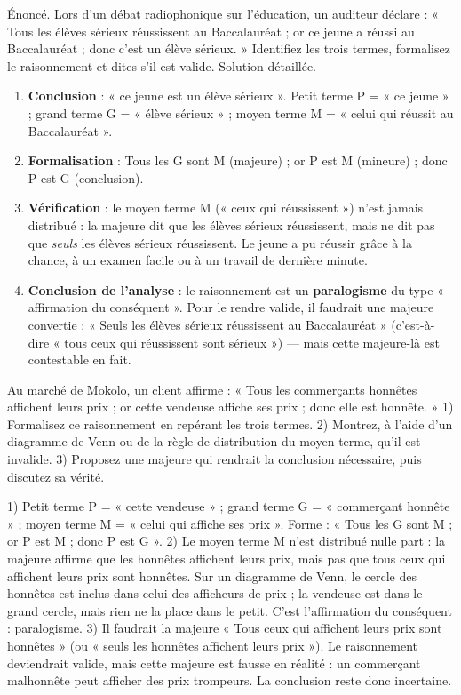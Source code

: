 \documentclass[11pt]{article}
\begin{document}
\begin{exoresolu}
Énoncé. Lors d'un débat radiophonique sur l'éducation, un auditeur déclare : « Tous les élèves sérieux réussissent au Baccalauréat ; or ce jeune a réussi au Baccalauréat ; donc c'est un élève sérieux. » Identifiez les trois termes, formalisez le raisonnement et dites s'il est valide.
\tcblower
Solution détaillée.
\begin{enumerate}
\item \textbf{Conclusion} : « ce jeune est un élève sérieux ». Petit terme P = « ce jeune » ; grand terme G = « élève sérieux » ; moyen terme M = « celui qui réussit au Baccalauréat ».
\item \textbf{Formalisation} : Tous les G sont M (majeure) ; or P est M (mineure) ; donc P est G (conclusion).
\item \textbf{Vérification} : le moyen terme M (« ceux qui réussissent ») n'est jamais distribué : la majeure dit que les élèves sérieux réussissent, mais ne dit pas que \emph{seuls} les élèves sérieux réussissent. Le jeune a pu réussir grâce à la chance, à un examen facile ou à un travail de dernière minute.
\item \textbf{Conclusion de l'analyse} : le raisonnement est un \textbf{paralogisme} du type « affirmation du conséquent ». Pour le rendre valide, il faudrait une majeure convertie : « Seuls les élèves sérieux réussissent au Baccalauréat » (c'est-à-dire « tous ceux qui réussissent sont sérieux ») — mais cette majeure-là est contestable en fait.
\end{enumerate}
\end{exoresolu}

\begin{exercice}
Au marché de Mokolo, un client affirme : « Tous les commerçants honnêtes affichent leurs prix ; or cette vendeuse affiche ses prix ; donc elle est honnête. » 1) Formalisez ce raisonnement en repérant les trois termes. 2) Montrez, à l'aide d'un diagramme de Venn ou de la règle de distribution du moyen terme, qu'il est invalide. 3) Proposez une majeure qui rendrait la conclusion nécessaire, puis discutez sa vérité.
\end{exercice}

\begin{corrige}[Exercice]
1) Petit terme P = « cette vendeuse » ; grand terme G = « commerçant honnête » ; moyen terme M = « celui qui affiche ses prix ». Forme : « Tous les G sont M ; or P est M ; donc P est G ».
2) Le moyen terme M n'est distribué nulle part : la majeure affirme que les honnêtes affichent leurs prix, mais pas que tous ceux qui affichent leurs prix sont honnêtes. Sur un diagramme de Venn, le cercle des honnêtes est inclus dans celui des afficheurs de prix ; la vendeuse est dans le grand cercle, mais rien ne la place dans le petit. C'est l'affirmation du conséquent : paralogisme.
3) Il faudrait la majeure « Tous ceux qui affichent leurs prix sont honnêtes » (ou « seuls les honnêtes affichent leurs prix »). Le raisonnement deviendrait valide, mais cette majeure est fausse en réalité : un commerçant malhonnête peut afficher des prix trompeurs. La conclusion reste donc incertaine.
\end{corrige}
\end{document}
